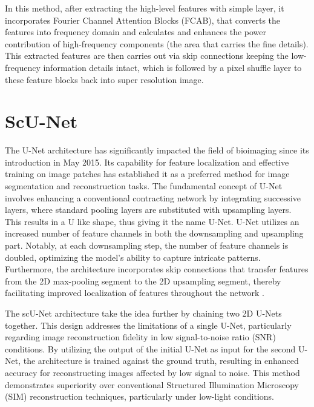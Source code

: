 \documentclass[11pt,
  paper=a4, 
  bibliography=totocnumbered,
	captions=tableheading,
	BCOR=10mm
]{scrreprt}
\theoremstyle{definition}
\begin{document}
\vspace{1cm}
\noindent
In this method, after extracting the high-level features with simple layer, it incorporates Fourier Channel Attention Blocks (FCAB),
that converts the features into frequency domain and calculates and enhances the power contribution of high-frequency components (the area that carries the fine details).
This extracted features are then carries out via skip connections keeping the low-frequency information details intact, which is followed by a pixel shuffle layer 
to  these feature blocks back into super resolution image. \cite{DFCAN}

\section{ScU-Net}
\label{sec:scu-net}
The U-Net architecture has significantly impacted the field of bioimaging since its introduction in May 2015. 
Its capability for feature localization and effective training on image patches has established it as a preferred method for image segmentation and reconstruction tasks.
The fundamental concept of U-Net involves enhancing a conventional contracting network by integrating successive layers, where standard pooling layers are substituted with upsampling layers.
This results in a U like shape, thus giving it the name U-Net. U-Net utilizes an increased number of feature channels in both the downsampling and upsampling part. Notably, at each downsampling step, 
the number of feature channels is doubled, optimizing the model's ability to capture intricate patterns. 
Furthermore, the architecture incorporates skip connections that transfer features from the 2D max-pooling segment to the 2D upsampling segment, 
thereby facilitating improved localization of features throughout the network \cite{U-net}.

\vspace{1cm}
\noindent
The scU-Net architecture take the idea further by chaining two 2D U-Nets together. 
This design addresses the limitations of a single U-Net, particularly regarding image reconstruction fidelity in 
low signal-to-noise ratio (SNR) conditions. By utilizing the output of the initial U-Net as input for the second U-Net, 
the architecture is trained against the ground truth, resulting in enhanced accuracy for reconstructing images affected
 by low signal to noise. This method demonstrates superiority over conventional Structured Illumination Microscopy (SIM) 
 reconstruction techniques, particularly under low-light conditions. \cite{Scu-net}
 
\end{document}
